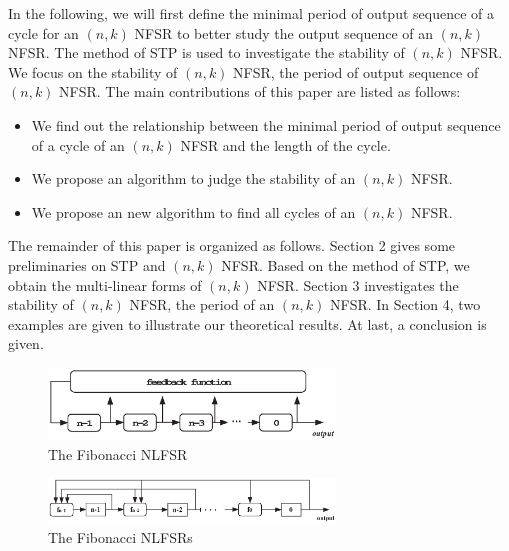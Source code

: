 \documentclass[conference]{IEEEtran}
\begin{document}
In the following, we will first define the minimal period of output sequence of a cycle for an $(n,k)$ NFSR to better study the output sequence of an $(n,k)$ NFSR. The method of STP is used to investigate the stability of $(n,k)$ NFSR. We focus on the stability of $(n,k)$ NFSR, the period of output sequence of $(n,k)$ NFSR. The main contributions of this paper are listed as follows:
\begin{itemize}
  \item We find out the relationship between the minimal period of output sequence of a cycle of an $(n,k)$ NFSR and the length of the cycle.
  \item We propose an algorithm to judge the stability of an $(n,k)$ NFSR.
  \item We propose an new algorithm to find all cycles of an $(n,k)$ NFSR.
\end{itemize}

The remainder of this paper is organized as follows. Section 2 gives some preliminaries on STP and $(n,k)$ NFSR. Based on the method of STP, we obtain the multi-linear forms of $(n,k)$ NFSR. Section 3 investigates the stability of $(n,k)$ NFSR, the period of an $(n,k)$ NFSR. In Section 4, two examples are given to illustrate our theoretical results. At last, a conclusion is given.
\begin{figure}
\centering
\includegraphics[width=3in]{fsr.eps}
\caption{The Fibonacci NLFSR}
\label{fsr}
\end{figure}
\begin{figure}
\centering
\includegraphics[width=3in]{Galois.eps}
\caption{The Fibonacci NLFSRs}
\label{gsr}
\end{figure}
\end{document}
